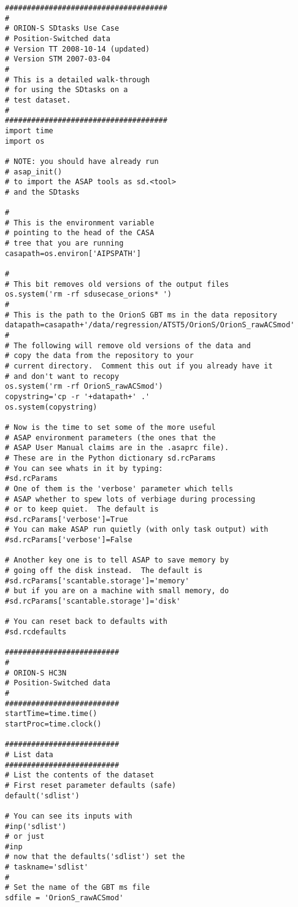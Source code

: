 \begin{verbatim}
#####################################
#
# ORION-S SDtasks Use Case
# Position-Switched data
# Version TT 2008-10-14 (updated)
# Version STM 2007-03-04
#
# This is a detailed walk-through
# for using the SDtasks on a
# test dataset.
#
#####################################
import time
import os

# NOTE: you should have already run
# asap_init()
# to import the ASAP tools as sd.<tool>
# and the SDtasks

#
# This is the environment variable
# pointing to the head of the CASA
# tree that you are running
casapath=os.environ['AIPSPATH']

#
# This bit removes old versions of the output files
os.system('rm -rf sdusecase_orions* ')
#
# This is the path to the OrionS GBT ms in the data repository
datapath=casapath+'/data/regression/ATST5/OrionS/OrionS_rawACSmod'
#
# The following will remove old versions of the data and
# copy the data from the repository to your
# current directory.  Comment this out if you already have it
# and don't want to recopy
os.system('rm -rf OrionS_rawACSmod')
copystring='cp -r '+datapath+' .'
os.system(copystring)

# Now is the time to set some of the more useful
# ASAP environment parameters (the ones that the
# ASAP User Manual claims are in the .asaprc file).
# These are in the Python dictionary sd.rcParams
# You can see whats in it by typing:
#sd.rcParams
# One of them is the 'verbose' parameter which tells
# ASAP whether to spew lots of verbiage during processing
# or to keep quiet.  The default is
#sd.rcParams['verbose']=True
# You can make ASAP run quietly (with only task output) with
#sd.rcParams['verbose']=False

# Another key one is to tell ASAP to save memory by
# going off the disk instead.  The default is
#sd.rcParams['scantable.storage']='memory'
# but if you are on a machine with small memory, do
#sd.rcParams['scantable.storage']='disk'

# You can reset back to defaults with
#sd.rcdefaults

##########################
#
# ORION-S HC3N
# Position-Switched data
#
##########################
startTime=time.time()
startProc=time.clock()

##########################
# List data
##########################
# List the contents of the dataset
# First reset parameter defaults (safe)
default('sdlist')

# You can see its inputs with
#inp('sdlist')
# or just
#inp
# now that the defaults('sdlist') set the
# taskname='sdlist'
#
# Set the name of the GBT ms file
sdfile = 'OrionS_rawACSmod'


\end{verbatim}
